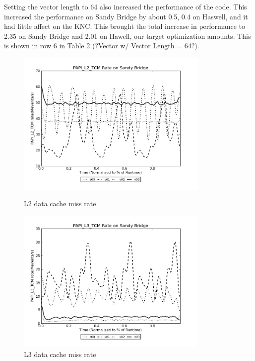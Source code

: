 Setting the vector length to 64 also increased the performance of the code.  This increased the performance on Sandy Bridge by about 0.5, 0.4 on Haswell, and it had little affect on the KNC.  This brought the total increase in performance to 2.35 on Sandy Bridge and 2.01 on Hawell, our target optimization amounts.  This is shown in row 6 in Table 2 (?Vector w/ Vector Length = 64?).

\begin{figure}
\centering
\begin{minipage}{1.\textwidth}
   \begin{center}
   \includegraphics[width=1.\linewidth,height=7cm]{figures/chem-PAPI_L2_TCM.png}
   \caption{L2 data cache miss rate}
   \end{center}
\end{minipage}
\begin{minipage}{1.\textwidth}
   \begin{center}
   \includegraphics[width=1.\linewidth,height=7cm]{figures/chem-PAPI_L3_TCM.png}
   \caption{L3 data cache miss rate}
   \end{center}
\end{minipage}
\begin{minipage}{1.\textwidth}

\end{minipage}
\end{figure}

